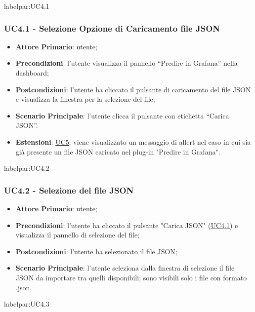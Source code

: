 		label{par:UC4.1}
		\subsubsection{UC4.1 - Selezione Opzione di Caricamento file JSON}
		\begin{itemize}
			\item\textbf{Attore Primario}: utente;
			\item\textbf{Precondizioni}: l’utente visualizza il pannello “Predire in Grafana” nella dashboard;
			\item\textbf{Postcondizioni}: l’utente ha cliccato il pulsante di caricamento del file JSON e visualizza la finestra per la selezione del file;
			\item\textbf{Scenario Principale}: l’utente clicca il pulsante con etichetta  “Carica JSON”.
			\item\textbf{Estensioni}: \hyperref[par:UC5]{UC5}: viene visualizzato un messaggio di allert nel caso in cui sia già presente un file JSON caricato nel plug-in "Predire in Grafana".
		\end{itemize}		
		
		label{par:UC4.2}
		\subsubsection{UC4.2 - Selezione del file JSON}
		\begin{itemize}
			\item\textbf{Attore Primario}: utente;
			\item\textbf{Precondizioni}: l’utente ha cliccato il pulsante "Carica JSON" (\hyperref[par:UC4.1]{UC4.1}) e visualizza il pannello di selezione del file;
			\item\textbf{Postcondizioni}: l’utente ha selezionato il file JSON;
			\item\textbf{Scenario Principale}: l’utente seleziona dalla finestra di selezione il file JSON da importare tra quelli disponibili; sono visibili solo i file con formato .json.
		\end{itemize}
		
		label{par:UC4.3}
